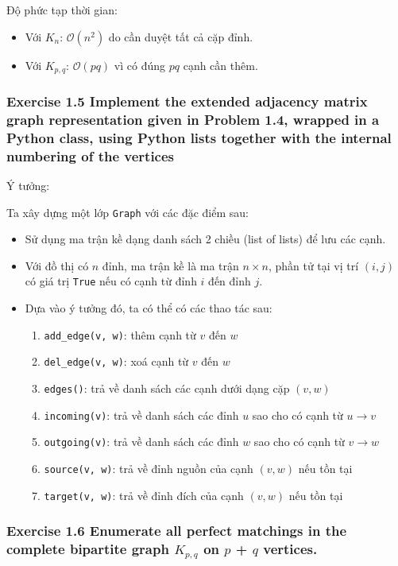 \documentclass{article}
\begin{document}
	Độ phức tạp thời gian:
	
	\begin{itemize}
		\item Với \(K_n\): \(\mathcal{O}(n^2)\) do cần duyệt tất cả cặp đỉnh.
		\item Với \(K_{p,q}\): \(\mathcal{O}(pq)\) vì có đúng \(pq\) cạnh cần thêm.
	\end{itemize}

	\subsubsection*{Exercise 1.5 Implement the extended adjacency matrix graph representation given in Problem 1.4, wrapped in a Python class, using Python lists together with the internal numbering of the vertices}
	
	Ý tưởng:
	
	Ta xây dựng một lớp \texttt{Graph} với các đặc điểm sau:
	
	\begin{itemize}
		\item Sử dụng ma trận kề dạng danh sách 2 chiều (list of lists) để lưu các cạnh. 
		\item Với đồ thị có $n$ đỉnh, ma trận kề là ma trận $n \times n$, phần tử tại vị trí $(i, j)$ có giá trị \texttt{True} nếu có cạnh từ đỉnh $i$ đến đỉnh $j$.
		\item Dựa vào ý tưởng đó, ta có thể có các thao tác sau:
		\begin{enumerate}
			\item \texttt{add\_edge(v, w)}: thêm cạnh từ $v$ đến $w$
			\item \texttt{del\_edge(v, w)}: xoá cạnh từ $v$ đến $w$
			\item \texttt{edges()}: trả về danh sách các cạnh dưới dạng cặp $(v, w)$
			\item \texttt{incoming(v)}: trả về danh sách các đỉnh $u$ sao cho có cạnh từ $u \to v$
			\item \texttt{outgoing(v)}: trả về danh sách các đỉnh $w$ sao cho có cạnh từ $v \to w$
			\item \texttt{source(v, w)}: trả về đỉnh nguồn của cạnh $(v, w)$ nếu tồn tại
			\item \texttt{target(v, w)}: trả về đỉnh đích của cạnh $(v, w)$ nếu tồn tại
		\end{enumerate}
	\end{itemize}
	
	\subsubsection*{Exercise 1.6 Enumerate all perfect matchings in the complete bipartite graph $K_{p,q}$ on $p$ + $q$ vertices.}
	
\end{document}
